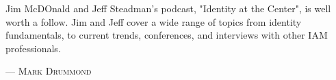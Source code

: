 Jim McDOnald and Jeff Steadman's podcast, "Identity at the Center", is well worth a follow. Jim and Jeff cover a wide range of topics from identity fundamentals, to current trends, conferences, and interviews with other IAM professionals.
  
\setlength{\parindent}{0cm}\par\textsc{ --- Mark Drummond }\par\vspace{12pt}\setlength{\parindent}{15pt}
